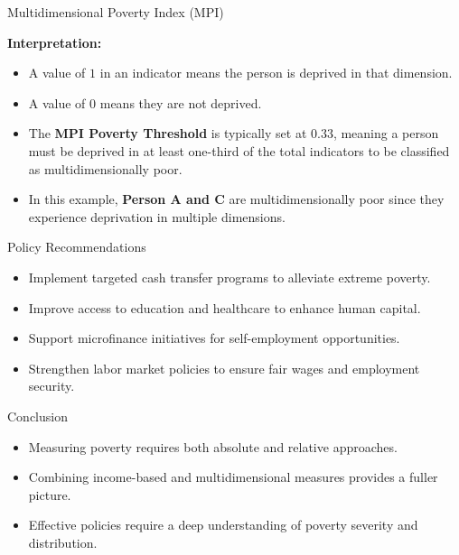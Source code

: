 \documentclass{beamer}
\begin{document}
\begin{frame}{Multidimensional Poverty Index (MPI)}

    \textbf{Interpretation:}
    \begin{itemize}
        \item A value of \(1\) in an indicator means the person is deprived in that dimension.
        \item A value of \(0\) means they are not deprived.
        \item The \textbf{MPI Poverty Threshold} is typically set at 0.33, meaning a person must be deprived in at least one-third of the total indicators to be classified as multidimensionally poor.
        \item In this example, \textbf{Person A and C} are multidimensionally poor since they experience deprivation in multiple dimensions.
    \end{itemize}
\end{frame}









\begin{frame}{Policy Recommendations}
    \begin{itemize}
        \item Implement targeted cash transfer programs to alleviate extreme poverty.
        \item Improve access to education and healthcare to enhance human capital.
        \item Support microfinance initiatives for self-employment opportunities.
        \item Strengthen labor market policies to ensure fair wages and employment security.
    \end{itemize}
\end{frame}

\begin{frame}{Conclusion}
    \begin{itemize}
        \item Measuring poverty requires both absolute and relative approaches.
        \item Combining income-based and multidimensional measures provides a fuller picture.
        \item Effective policies require a deep understanding of poverty severity and distribution.
    \end{itemize}
\end{frame}
\end{document}
